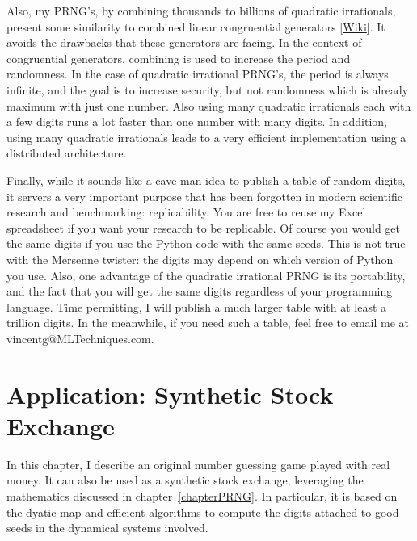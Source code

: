 \documentclass[oneside,10pt]{book}
\begin{document}
Also, my PRNG's, by combining thousands to billions of quadratic irrationals, present some similarity to 
 \textcolor{index}{combined linear congruential generators} [\href{https://en.wikipedia.org/wiki/Combined_linear_congruential_generator}{Wiki}]. It avoids the drawbacks that these generators are facing.  In the context of congruential generators, combining is used to increase the period and randomness. In the case of
 quadratic irrational PRNG's, the period is always infinite, and the goal is to increase security, but not randomness which is already maximum with just one number. Also using many quadratic irrationals each with a few digits runs a lot faster than one number with many digits. In addition, using many quadratic irrationals leads to a very efficient implementation using a
 distributed architecture.

Finally, while it sounds like a cave-man idea to publish a table of random digits, it servers a very important purpose that has been forgotten in modern scientific research and benchmarking: replicability. You are free to reuse my Excel spreadsheet if
 you want your research to be replicable. Of course you would get the same digits if you use the Python code with the same seeds. This is not true with the Mersenne twister: the digits may depend on which version of Python you use. Also, one advantage of the quadratic irrational PRNG is its portability, and the fact that you will get the same digits regardless of your programming language. Time permitting, I will publish a much larger table with at least a trillion digits. 
 In the meanwhile, if you need such a table, feel free to email me at vincentg@MLTechniques.com. 


\chapter{Application: Synthetic Stock Exchange}{}\label{pouti}

In this chapter, I describe an original number guessing game played with real money. It can also be used
 as a synthetic stock exchange, leveraging the mathematics discussed in chapter~\ref{chapterPRNG}.  In particular, it is based on the \textcolor{index}{dyatic map} and efficient algorithms to 
compute the \textcolor{index}{digits} attached to
\textcolor{index}{good seeds} in the dynamical systems involved.
\end{document}
